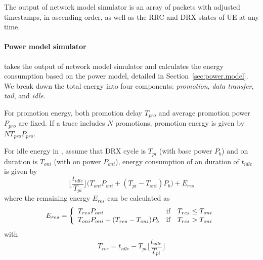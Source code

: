 
The output of network model simulator is an array of packets with adjusted timestamps, in ascending order, as well as the RRC and DRX states of UE at any time.

\paragraph{Power model simulator} takes the output of network model simulator and calculates the energy consumption based on the power model, detailed in Section~\ref{sec:power.model}. We break down the total energy into four components: {\em promotion}, {\em data transfer}, {\em tail}, and {\em idle}.

For promotion energy, both promotion delay $T_{pro}$ and average promotion power $P_{pro}$ are fixed. If a trace includes $N$ promotions, promotion energy is given by $NT_{pro}P_{pro}$.

For idle energy in \RI, assume that DRX cycle is $T_{pi}$ (with base power $P_{b}$) and on duration is $T_{oni}$ (with on power $P_{oni}$), energy consumption of an duration of $t_{idle}$ is given by
\begin{equation*}
\lfloor \frac{t_{idle}}{T_{pi}} \rfloor \Big(T_{oni} P_{oni} + (T_{pi} - T_{oni}) P_{b}\Big) + E_{res}
\end{equation*}
where the remaining energy $E_{res}$ can be calculated as
\[E_{res} = \left\{ 
\begin{array}{l l}
T_{res}P_{oni} & \mbox{if$\quad T_{res} \le T_{oni}$}\\
T_{oni}P_{oni} + (T_{res}-T_{oni}) P_{b} & \mbox{if$\quad T_{res} > T_{oni}$}\\ 
\end{array} \right. \]
with
\begin{equation*}
T_{res} = t_{idle} - T_{pi}\lfloor \frac{t_{idle} }{T_{pi}} \rfloor
\end{equation*}

